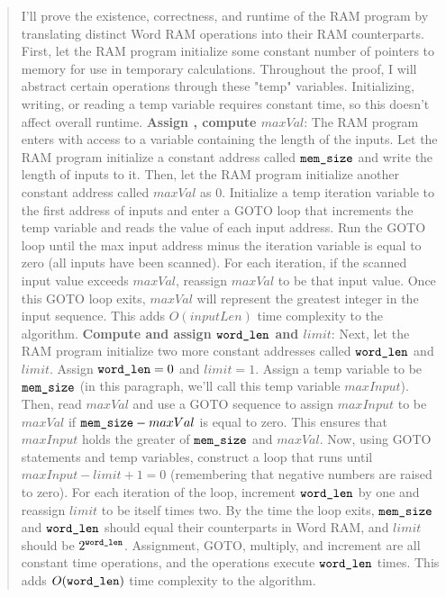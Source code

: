 \documentclass[11pt]{article}
\begin{document}
\begin{enumerate}
\begin{quote}
    \color{purple}
     I'll prove the existence, correctness, and runtime of the RAM program by translating distinct Word RAM operations into their RAM counterparts. \newline 
     \newline
    First, let the RAM program initialize some constant number of pointers to memory for use in temporary calculations. Throughout the proof, I will abstract certain operations through these "temp" variables. Initializing, writing, or reading a temp variable requires constant time, so this doesn't affect overall runtime. \newline
    \newline
    \textbf{Assign \memsize, compute $maxVal$}: \newline
    The RAM program enters with access to a variable containing the length of the inputs. Let the RAM program initialize a constant address called $\texttt{mem\_size}$ and write the length of inputs to it. Then, let the RAM program initialize another constant address called $maxVal$ as 0. Initialize a temp iteration variable to the first address of inputs and enter a GOTO loop that increments the temp variable and reads the value of each input address. Run the GOTO loop until the max input address minus the iteration variable is equal to zero (all inputs have been scanned). For each iteration, if the scanned input value exceeds $maxVal$, reassign $maxVal$ to be that input value. Once this GOTO loop exits, $maxVal$ will represent the greatest integer in the input sequence. This adds $O(inputLen)$ time complexity to the algorithm.
    \newline
    \newline
    \textbf{Compute and assign $\texttt{word\_len}$ and $limit$}: \newline
    Next, let the RAM program initialize two more constant addresses called $\texttt{word\_len}$ and $limit$. Assign $\texttt{word\_len} = 0$ and $limit = 1$. Assign a temp variable to be $\texttt{mem\_size}$ (in this paragraph, we'll call this temp variable $maxInput$). Then, read $maxVal$ and use a GOTO sequence to assign $maxInput$ to be $maxVal$ if $\texttt{mem\_size} - maxVal$ is equal to zero. This ensures that $maxInput$ holds the greater of $\texttt{mem\_size}$ and $maxVal$. Now, using GOTO statements and temp variables, construct a loop that runs until $maxInput - limit + 1 = 0$ (remembering that negative numbers are raised to zero). For each iteration of the loop, increment $\texttt{word\_len}$ by one and reassign $limit$ to be itself times two. By the time the loop exits, $\texttt{mem\_size}$ and $\texttt{word\_len}$ should equal their counterparts in Word RAM, and $limit$ should be $2^{\texttt{word\_len}}$. Assignment, GOTO, multiply, and increment are all constant time operations, and the operations execute $\texttt{word\_len}$ times. This adds $O(\texttt{word\_len})$ time complexity to the algorithm.

\end{quote}
\end{enumerate}
\end{document}

